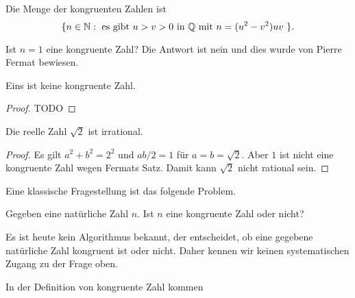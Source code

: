\begin{lemma}
  Die Menge der kongruenten Zahlen ist
  $$
  \{ n \in {\mathbb{N}} : \text{ es gibt $u>v>0$ in ${\mathbb{Q}}$ mit $n=(u^2-v^2)uv$ }
  \}.
  $$
\end{lemma}


Ist $n=1$ eine kongruente Zahl? Die Antwort ist nein und dies wurde
von Pierre Fermat bewiesen.

\begin{satz}[Fermat]
  Eins  ist keine kongruente Zahl.
\end{satz}
\begin{proof}
  TODO
\end{proof}

\begin{korollar}
  Die reelle Zahl $\sqrt{2}$ ist irrational. 
\end{korollar}
\begin{proof}
  Es gilt $a^2+b^2=2^2$ und $ab/2=1$ für $a=b=\sqrt 2$. Aber $1$ ist
  nicht eine kongruente Zahl wegen Fermats Satz. Damit kann $\sqrt 2$
  nicht rational sein.
\end{proof}

Eine klassische Fragestellung ist das folgende Problem.

\begin{problem}
  Gegeben eine natürliche Zahl $n$. Ist $n$ eine kongruente Zahl oder
  nicht? 
\end{problem}

Es ist heute kein Algorithmus bekannt, der entscheidet, ob eine
gegebene natürliche Zahl kongruent ist oder nicht. Daher kennen wir
keinen systematischen Zugang zu der Frage oben.

In der Definition von kongruente Zahl kommen 

